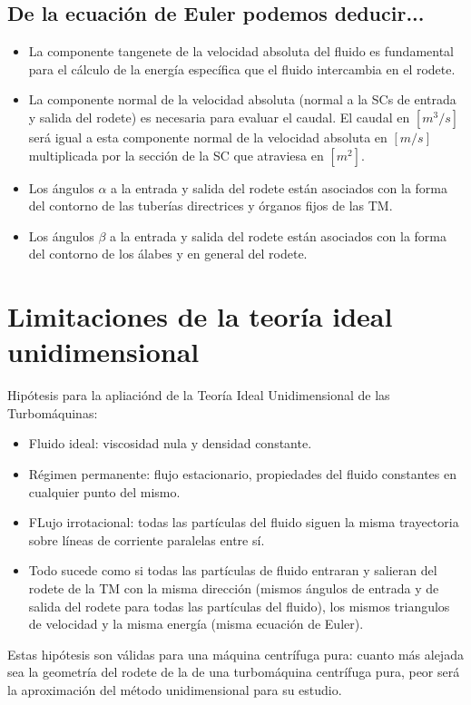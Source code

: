 \subsection{De la ecuación de Euler podemos deducir...}
\begin{itemize}
    \item La componente tangenete de la velocidad absoluta del fluido es fundamental para el cálculo de la energía específica que el fluido intercambia en el rodete.
    \item La componente normal de la velocidad absoluta (normal a la SCs de entrada y salida del rodete) es necesaria para evaluar el caudal. El caudal en $[m^3/s]$ será igual a esta componente normal de la velocidad absoluta en $[m/s]$ multiplicada por la sección de la SC que atraviesa en $[m^2]$.
    \item Los ángulos $\alpha$ a la entrada y salida del rodete están asociados con la forma del contorno de las tuberías directrices y órganos fijos de las TM.
    \item Los ángulos $\beta$ a la entrada y salida del rodete están asociados con la forma del contorno de los álabes y en general del rodete.
\end{itemize}

\section{Limitaciones de la teoría ideal unidimensional}
Hipótesis para la apliaciónd de la Teoría Ideal Unidimensional de las Turbomáquinas:
\begin{itemize}
    \item Fluido ideal: viscosidad nula y densidad constante.
    \item Régimen permanente: flujo estacionario, propiedades del fluido constantes en cualquier punto del mismo.
    \item FLujo irrotacional: todas las partículas del fluido siguen la misma trayectoria sobre líneas de corriente paralelas entre sí.
    \item Todo sucede como si todas las partículas de fluido entraran y salieran del rodete de la TM con la misma dirección (mismos ángulos de entrada y de salida del rodete para todas las partículas del fluido), los mismos triangulos de velocidad y la misma energía (misma ecuación de Euler).
\end{itemize}

Estas hipótesis son válidas para una máquina centrífuga pura: cuanto más alejada sea la geometría del rodete de la de una turbomáquina centrífuga pura, peor será la aproximación del método unidimensional para su estudio.

